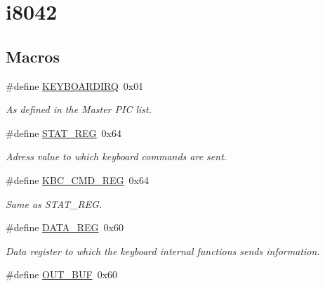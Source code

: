 \hypertarget{group__i8042}{\section{i8042}
\label{group__i8042}
}
\subsection*{Macros}
\begin{DoxyCompactItemize}
\item 
\hypertarget{group__i8042_ga633dd96f1e56767f36303ef16fb8576a}{\#define \hyperlink{group__i8042_ga633dd96f1e56767f36303ef16fb8576a}{K\-E\-Y\-B\-O\-A\-R\-D\-I\-R\-Q}~0x01}\label{group__i8042_ga633dd96f1e56767f36303ef16fb8576a}

\begin{DoxyCompactList}\small\item\em As defined in the Master P\-I\-C list. \end{DoxyCompactList}\item 
\hypertarget{group__i8042_ga89c4d098b53809674457b1660b1af780}{\#define \hyperlink{group__i8042_ga89c4d098b53809674457b1660b1af780}{S\-T\-A\-T\-\_\-\-R\-E\-G}~0x64}\label{group__i8042_ga89c4d098b53809674457b1660b1af780}

\begin{DoxyCompactList}\small\item\em Adress value to which keyboard commands are sent. \end{DoxyCompactList}\item 
\hypertarget{group__i8042_ga6d57c7927a10f638c83046b52c8caac9}{\#define \hyperlink{group__i8042_ga6d57c7927a10f638c83046b52c8caac9}{K\-B\-C\-\_\-\-C\-M\-D\-\_\-\-R\-E\-G}~0x64}\label{group__i8042_ga6d57c7927a10f638c83046b52c8caac9}

\begin{DoxyCompactList}\small\item\em Same as S\-T\-A\-T\-\_\-\-R\-E\-G. \end{DoxyCompactList}\item 
\hypertarget{group__i8042_ga71b8ba376f687142f60a82d18c2715e0}{\#define \hyperlink{group__i8042_ga71b8ba376f687142f60a82d18c2715e0}{D\-A\-T\-A\-\_\-\-R\-E\-G}~0x60}\label{group__i8042_ga71b8ba376f687142f60a82d18c2715e0}

\begin{DoxyCompactList}\small\item\em Data register to which the keyboard internal functions sends information. \end{DoxyCompactList}\item 
\hypertarget{group__i8042_gacfb42dde389e8ca36ab267002fbf5c6a}{\#define \hyperlink{group__i8042_gacfb42dde389e8ca36ab267002fbf5c6a}{O\-U\-T\-\_\-\-B\-U\-F}~0x60}\label{group__i8042_gacfb42dde389e8ca36ab267002fbf5c6a}


\end{DoxyCompactItemize}
